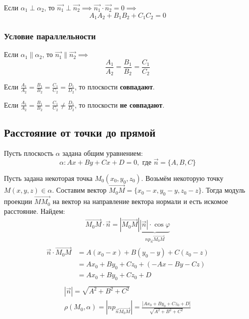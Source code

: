 Если $\alpha_1 \perp \alpha_2$, то $\vec{n_1} \perp \vec{n_2} \implies \vec{n_1} \cdot \vec{n_2} = 0 \implies$ \[
  \boxed{A_1 A_2 + B_1 B_2 + C_1 C_2 = 0}
\]

\subsubsection{Условие параллельности}

Если $\alpha_1 \parallel \alpha_2$, то $\vec{n_1} \parallel \vec{n_2} \implies$ \[
  \boxed{\frac{A_1}{A_2} = \frac{B_1}{B_2} = \frac{C_1}{C_2}}
\]

\begin{note}
  Если $\frac{A_1}{A_2} = \frac{B_1}{B_2} = \frac{C_1}{C_2} = \frac{D_1}{D_2}$, то плоскости \textbf{совпадают}.
\end{note}
\begin{note}
  Если $\frac{A_1}{A_2} = \frac{B_1}{B_2} = \frac{C_1}{C_2} \neq \frac{D_1}{D_2}$, то плоскости \textbf{не совпадают}.
\end{note}

\subsection{Расстояние от точки до прямой}

Пусть плоскость $\alpha$ задана общим уравнением: \[
    \alpha: Ax + By + Cx + D = 0, \text{ где } \vec{n} = \{A, B, C\} 
\] 

Пусть задана некоторая точка $M_0(x_0, y_0, z_0)$. 
Возьмём некоторую точку $M(x, y, z) \in \alpha$. 
Составим вектор $\overrightarrow{M_0M} = \{x_0 - x, y_0 - y, z_0 - z\}$. 
Тогда модуль проекции $\overrightarrow{MM_0}$ на вектор на направление вектора нормали и есть искомое расстояние. 
Найдем: 
\begin{gather*}
  \overrightarrow{M_0M} \cdot \vec{n} = |\overrightarrow{M_0M}|\underbrace
  {|\vec{n}| \cdot \cos \varphi}_
  {np_{\vec{n}}\overrightarrow{M_0M}}
\end{gather*}
\begin{align*}
  \vec{n} \cdot \overrightarrow{M_0M} &= A(x_0 - x) + B(y_0 - y) + C(z_0 - z) \\
                                 &= Ax_0 + By_0 + Cz_0 + (-Ax - By - Cz) \\
                                 &= Ax_0 + By_0 + Cz_0  + D \\
\end{align*}
\begin{gather*}
  |\vec{n}| = \sqrt{A^2 + B^2 + C^2} \\
  \boxed{\rho(M_0, \alpha) = |np_{\vec{n}\overrightarrow{M_0M}}| = \frac{|Ax_0 + By_0 + Cz_0 + D| }{\sqrt{A^2 + B^2 + C^2} } }
\end{gather*}   

